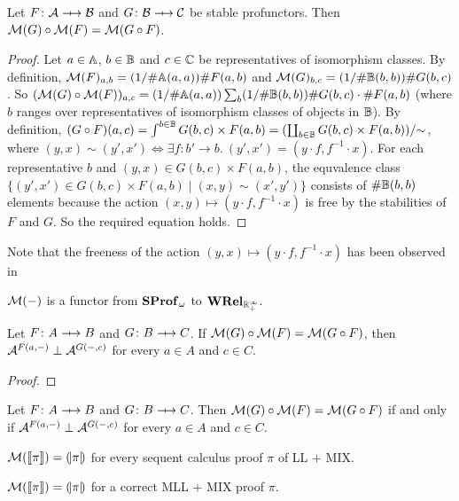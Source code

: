 \begin{theorem}
    Let \( F \colon \creed \profarrow \creedb \) and \( G \colon \creedb \profarrow \creedc \) be stable profunctors.
    Then \( \mathcal{M}({G}) \circ \mathcal{M}({F}) = \mathcal{M}({G \circ F}) \).
\end{theorem}
\begin{proof}
    Let \( a \in \mathbb{A} \), \( b \in \mathbb{B} \) and \( c \in \mathbb{C} \) be representatives of isomorphism classes.
    By definition, \( \mathcal{M}({F})_{a,b} = (1/\#\mathbb{A}(a,a)) \# F(a,b) \) and \( \mathcal{M}({G})_{b,c} = (1/\#\mathbb{B}(b,b)) \#G(b,c) \).
    So \( (\mathcal{M}({G}) \circ \mathcal{M}({F}))_{a,c} = (1/\#\mathbb{A}(a,a)) \sum_{b} (1/\#\mathbb{B}(b,b)) \# G(b,c) \cdot \# F(a,b) \) (where \( b \) ranges over representatives of isomorphism classes of objects in \( \mathbb{B} \)).
    By definition, \( (G \circ F)(a,c) = \int^{b \in \mathbb{B}} G(b,c) \times F(a,b) = (\coprod_{b \in \mathbb{B}} G(b,c) \times F(a,b)) / {\sim} \), where \( (y,x) \sim (y', x') \Longleftrightarrow \exists f \colon b' \to b.\ (y', x') = (y \cdot f, f^{-1} \cdot x) \).
    For each representative \( b \) and \( (y,x) \in G(b,c) \times F(a,b) \), the equvalence class \( \{ (y', x') \in G(b,c) \times F(a,b) \mid (x,y) \sim (x', y') \} \) consists of \( \# \mathbb{B}(b,b) \) elements because the action \( (x,y) \mapsto (y \cdot f, f^{-1} \cdot x) \) is free by the stabilities of \( F \) and \( G \).
    So the required equation holds.
\end{proof}
Note that the freeness of the action \( (y,x) \mapsto (y \cdot f, f^{-1} \cdot x) \) has been observed in \cite{Fiore2024}

\begin{corollary}
    \( \mathcal{M}({{-}}) \) is a functor from \( \mathbf{SProf}_\omega \) to \( \mathbf{WRel}_{\mathbb{R}_+^\infty} \).
\end{corollary}

\begin{theorem}
    Let \( F \colon A \profarrow B \) and \( G \colon B \profarrow C \).
    If \( \mathcal{M}({G}) \circ \mathcal{M}({F}) = \mathcal{M}({G \circ F}) \), then \( \mathcal{A}^{F(a, {-})} \mathrel{\bot} \mathcal{A}^{G({-}, c)} \) for every \( a \in A \) and \( c \in C \).
\end{theorem}
\begin{proof}
    
\end{proof}

\begin{theorem}
    Let \( F \colon A \profarrow B \) and \( G \colon B \profarrow C \).
    Then \( \mathcal{M}({G}) \circ \mathcal{M}({F}) = \mathcal{M}({G \circ F}) \) if and only if \( \mathcal{A}^{F(a, {-})} \mathrel{\bot} \mathcal{A}^{G({-}, c)} \) for every \( a \in A \) and \( c \in C \).
\end{theorem}

\begin{corollary}
    \( \mathcal{M}({\llbracket{\pi}\rrbracket}) = (\!|{\pi}|\!) \) for every sequent calculus proof \( \pi \) of LL + MIX.
\end{corollary}
\begin{corollary}
    \( \mathcal{M}({\llbracket{\pi}\rrbracket}) = (\!|{\pi}|\!) \) for a correct MLL + MIX proof \( \pi \). 
\end{corollary}




